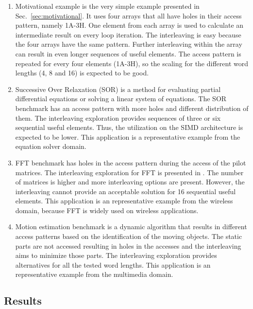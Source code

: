 \documentclass[prodmode,acmtecs]{acmsmall}
\begin{document}
\begin{enumerate}
\item Motivational example is the very simple example presented in Sec.~\ref{sec:motivational}. 
It uses four arrays that all have holes in their access pattern, namely 1A-3H.
One element from each array is used to calculate an intermediate result on every loop iteration.
The interleaving is easy because the four arrays have the same pattern.
Further interleaving within the array can result in even longer sequences of useful elements.
The access pattern is repeated for every four elements (1A-3H), so the scaling for the different word lengths (4, 8 and 16) is expected to be good. 
\item Successive Over Relaxation (SOR) is a method for evaluating partial differential equations or solving a linear system of equations.
The SOR benchmark has an access pattern with more holes and different distribution of them.
The interleaving exploration provides sequences of three or six sequential useful elements.
Thus, the utilization on the SIMD architecture is expected to be lower.
This application is a representative example from the equation solver domain.
\item FFT benchmark has holes in the access pattern during the access of the pilot matrices. 
The interleaving exploration for FFT is presented in \cite{sharma2013data}.
The number of matrices is higher and more interleaving options are present.
However, the interleaving cannot provide an acceptable solution for 16 sequential useful elements.
This application is an representative example from the wireless domain, because FFT is widely used on wireless applications.
\item Motion estimation benchmark is a dynamic algorithm that results in different access patterns based on the identification of the moving objects. 
The static parts are not accessed resulting in holes in the accesses and the interleaving aims to minimize those parts.
The interleaving exploration provides alternatives for all the  tested word lengths. 
This application is an representative example from the multimedia domain.
\end{enumerate}

\subsection{Results}
\label{sec:results}

\end{document}
